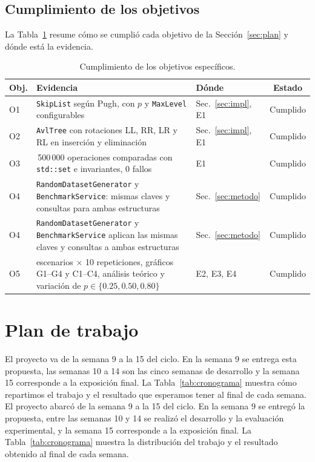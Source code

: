 \documentclass[11pt,a4paper]{article}
\begin{document}
\subsection{Cumplimiento de los objetivos}

La Tabla~\ref{tab:objetivos} resume cómo se cumplió cada objetivo de la
Sección~\ref{sec:plan} y dónde está la evidencia.

\begin{table}[!htb]
\centering
\renewcommand{\arraystretch}{1.2}
\small
\begin{tabularx}{\textwidth}{l >{\raggedright\arraybackslash}X l c}
\toprule
\textbf{Obj.} & \textbf{Evidencia} & \textbf{Dónde} & \textbf{Estado} \\
\midrule
O1 & \texttt{SkipList} según Pugh, con $p$ y \texttt{MaxLevel} configurables & Sec.~\ref{sec:impl}, E1 & Cumplido \\
O2 & \texttt{AvlTree} con rotaciones LL, RR, LR y RL en inserción y eliminación & Sec.~\ref{sec:impl}, E1 & Cumplido \\
O3 & 1\,500\,000 operaciones comparadas con \texttt{std::set} e invariantes, 0 fallos & E1 & Cumplido \\
O4 & \texttt{RandomDatasetGenerator} y \texttt{BenchmarkService}: mismas claves y consultas para ambas estructuras & Sec.~\ref{sec:metodo} & Cumplido \\
O4 & \texttt{RandomDatasetGenerator} y \texttt{BenchmarkService} aplican las mismas claves y consultas a ambas estructuras & Sec.~\ref{sec:metodo} & Cumplido \\
O5 & 12 escenarios $\times$ 10 repeticiones, gráficos G1--G4 y C1--C4, análisis teórico y variación de $p \in \{0.25, 0.50, 0.80\}$ & E2, E3, E4 & Cumplido \\
\bottomrule
\end{tabularx}
\caption{Cumplimiento de los objetivos específicos.}
\label{tab:objetivos}
\end{table}

\section{Plan de trabajo}\label{sec:cronograma}

El proyecto va de la semana 9 a la 15 del ciclo. En la semana 9 se entrega
esta propuesta, las semanas 10 a 14 son las cinco semanas de desarrollo y la
semana 15 corresponde a la exposición final. La Tabla~\ref{tab:cronograma}
muestra cómo repartimos el trabajo y el resultado que esperamos tener al final
de cada semana.
El proyecto abarcó de la semana 9 a la 15 del ciclo. En la semana 9 se entregó
la propuesta, entre las semanas 10 y 14 se realizó el desarrollo y la
evaluación experimental, y la semana 15 corresponde a la exposición final. La
Tabla~\ref{tab:cronograma} muestra la distribución del trabajo y el resultado
obtenido al final de cada semana.
\end{document}
